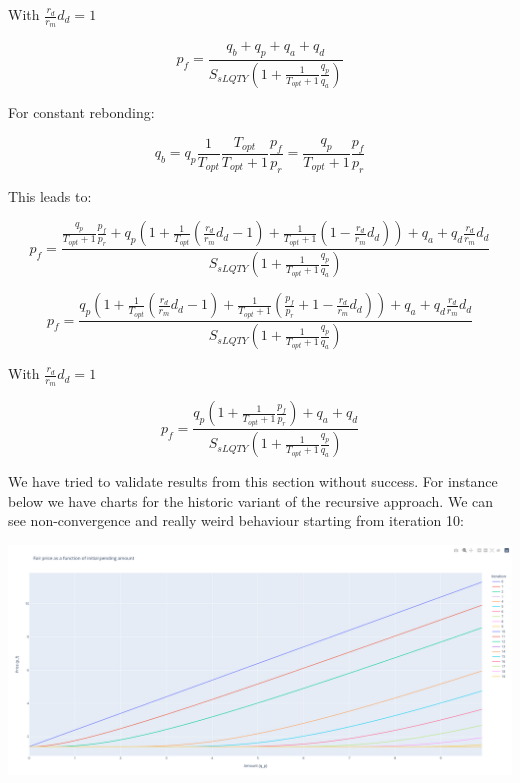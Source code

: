 \documentclass{article}
\begin{document}
With $\frac{r_{d}}{r_{m}}d_{d}=1$

\begin{equation}
  \label{eq:recursive_optimal_2}
p_{f} = \frac{q_{b}+q_{p}+q_{a}+q_{d}}{S_{sLQTY}\left(1+  \frac{1}{T_{opt}+1}\frac{q_{p}}{q_{a}}\right)}
\end{equation}

For constant rebonding:

\begin{equation}
q_{b} = q_{p} \frac{1}{T_{opt}} \frac{T_{opt}}{T_{opt}+1}\frac{p_{f}}{p_{r}} = \frac{q_{p}}{T_{opt}+1}\frac{p_{f}}{p_{r}}
\end{equation}

This leads to:

\[
p_{f} = \frac{ \frac{q_{p}}{T_{opt}+1}\frac{p_{f}}{p_{r}}+q_{p} \left(1+\frac{1}{T_{opt}}\left(\frac{r_{d}}{r_{m}}d_{d}-1\right)+ \frac{1}{T_{opt}+1}\left( 1 - \frac{r_{d}}{r_{m}}d_{d} \right)\right)+q_{a}+q_{d}\frac{r_{d}}{r_{m}}d_{d}}{S_{sLQTY}\left(1+  \frac{1}{T_{opt}+1}\frac{q_{p}}{q_{a}}\right)}
\]

\begin{equation}
p_{f} = \frac{q_{p} \left(1 + \frac{1}{T_{opt}}\left(\frac{r_{d}}{r_{m}}d_{d}-1\right)+ \frac{1}{T_{opt}+1}\left(\frac{p_{f}}{p_{r}} + 1 - \frac{r_{d}}{r_{m}}d_{d} \right)\right)+q_{a}+q_{d}\frac{r_{d}}{r_{m}}d_{d}}{S_{sLQTY}\left(1+  \frac{1}{T_{opt}+1}\frac{q_{p}}{q_{a}}\right)}
\end{equation}

With $\frac{r_{d}}{r_{m}}d_{d}=1$

\begin{equation}
p_{f} = \frac{q_{p} \left( 1+   \frac{1}{T_{opt}+1}\frac{p_{f}}{p_{r}} \right)+q_{a}+q_{d}}{S_{sLQTY}\left(1+  \frac{1}{T_{opt}+1}\frac{q_{p}}{q_{a}}\right)}
\end{equation}

We have tried to validate results from this section without success. For instance below we have charts for the historic variant of the recursive approach. We can see non-convergence and really weird behaviour starting from iteration 10:

\includegraphics[width=\linewidth]{./ChickenBonds_Whitepaper_recursive_price_1.png}
\end{document}

